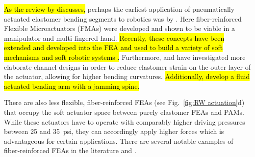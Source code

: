\hl{As the review by \mbox{\citet{rus2014soft}} discusses,} perhaps the earliest application of pneumatically actuated elastomer bending segments to robotics was by \citet{suzumori1992applying}.
Here fiber-reinforced Flexible Microactuators (FMAs) were developed and shown to be viable in a manipulator and multi-fingered hand.
\hl{Recently, these concepts have been extended and developed into the FEA and used to build a variety of soft mechanisms \mbox{\citep{shepherd2011multigait, ilievski2011soft, morin2012camouflage}}
\mbox{\citep{martinez2013robotic}}
and soft robotic systems
\mbox{\citep{onal2011soft, marchese2011soft, onal2013autonomous}}
\mbox{\citep{marchese2014autonomous, marchese2014design, marchese2014whole}}
\mbox{\citep{katzschmann2014hydraulic, katzschmann2015autonomous}}
\mbox{\citep{tolley2014untethered, tolley2014resilient}} \mbox{\citep{marchese2015design}}
\mbox{\citep{marchese2015control, marchese2015dynamics}}.}
Furthermore, \citet{polygerinos2013towards} and \citet{mosadegh2014pneumatic} have investigated more elaborate channel designs in order to reduce elastomer strain on the outer layer of the actuator, allowing for higher bending curvatures.
\hl{Additionally, \mbox{\citet{cianchetti2014soft}} develop a fluid actuated bending arm with a jamming \mbox{\citep{brown2010universal, liu1998nonlinear}} spine.}

There are also less flexible, fiber-reinforced FEAs (see Fig.~\ref{fig:RW actuation}d) that occupy the soft actuator space between purely elastomer FEAs and PAMs.
While these actuators have to operate with comparably higher driving pressures between 25 and 35~psi, they can accordingly apply higher forces which is advantageous for certain applications.
There are several notable examples of fiber-reinforced FEAs in the literature \citet{suzumori1992applying, suzumori2007bending, bishop2012design, galloway2013mechanically, deimel2013compliant, deimel2014novel} and \citet{park2014design}.


